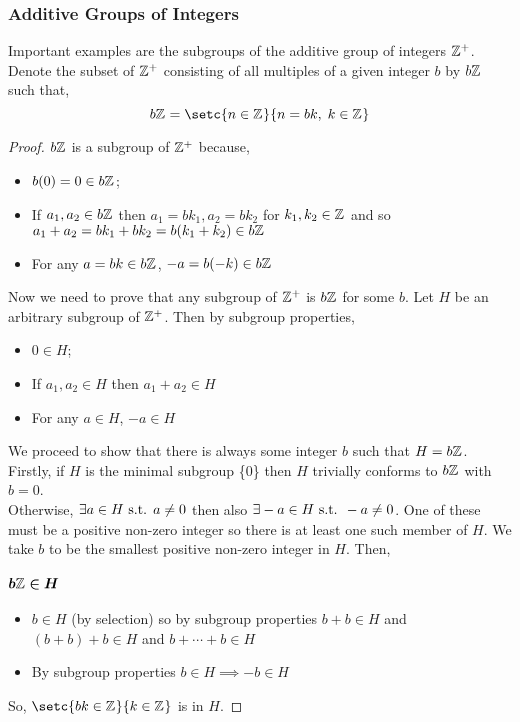 \documentclass[MathsNotesBase.tex]{subfiles}
\begin{document}
{	\subsubsection{Additive Groups of Integers}
	Important examples are the subgroups of the additive group of integers $\mathbb{Z}^{+}$. Denote the subset of $\mathbb{Z}^{+}$ consisting of all multiples of a given integer $b$ by $b\mathbb{Z}^{}$ such that,
	\[ b\Z{} = \setc{n \in \Z{}}{n = bk,\; k \in \Z{}} \]
	\begin{proof}
		$b\mathbb{Z}^{}$ is a subgroup of $\mathbb{Z}^{+}$ because,
		\begin{itemize}
			\item{$b(0) = 0 \in b\mathbb{Z}^{}$;}
			\item{If $a_1,a_2 \in b\mathbb{Z}^{}$ then $a_1 = bk_1, a_2 = bk_2$ for $k_1, k_2 \in \mathbb{Z}^{}$ and so $a_1 + a_2 = bk_1 + bk_2 = b(k_1 + k_2) \in b\mathbb{Z}^{}$}
			\item{For any $a = bk \in b\mathbb{Z}^{}$, $-a = b(-k) \in b\mathbb{Z}^{}$}
		\end{itemize}
		Now we need to prove that any subgroup of $\mathbb{Z}^{+}$ is $b\mathbb{Z}^{}$ for some $b$. Let $H$ be an arbitrary subgroup of $\mathbb{Z}^{+}$. Then by subgroup properties,
		\begin{itemize}
			\item{$0 \in H$;}
			\item{If $a_1,a_2 \in H$ then $a_1 + a_2 \in H$}
			\item{For any $a \in H$, $-a \in H$}
		\end{itemize}
		We proceed to show that there is always some integer $b$ such that $H = b\mathbb{Z}^{}$.\\
		Firstly, if $H$ is the minimal subgroup \{0\} then $H$ trivially conforms to $b\mathbb{Z}^{}$ with $b = 0$.\\
		Otherwise, $\exists a \in H \text{ s.t. } a \neq 0$ then also $\exists -a \in H \text{ s.t. } -a \neq 0$. One of these must be a positive non-zero integer so there is at least one such member of $H$. We take $b$ to be the smallest positive non-zero integer in $H$. Then,
		\paragraph{$\bm{b\mathbb{Z}^{} \in H}$}
		\begin{itemize}
			\item{$b \in H$ (by selection) so by subgroup properties $b + b \in H$ and $(b + b) + b \in H$ and $b + \cdots + b \in H$}
			\item{By subgroup properties $b \in H \implies -b \in H$}
		\end{itemize}
		So, $\setc{bk \in \Z{}}{k \in \Z{}}$ is in $H$.

\end{proof}}
\end{document}
